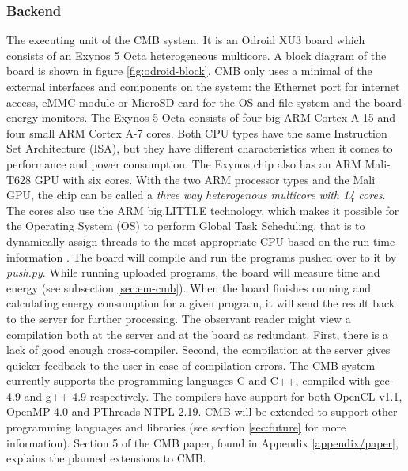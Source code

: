 \subsubsection{Backend} The executing unit of the CMB system. It is an Odroid XU3 board \cite{m:odroid} which consists of an Exynos 5 Octa heterogeneous multicore. A block diagram of the board is shown in figure \ref{fig:odroid-block}. CMB only uses a minimal of the external interfaces and components on the system: the Ethernet port for internet access, eMMC module or MicroSD card for the OS and file system and the board energy monitors. The Exynos 5 Octa consists of four big ARM Cortex A-15 and four small ARM Cortex A-7 cores. Both CPU types have the same Instruction Set Architecture (ISA), but they have different characteristics when it comes to performance and power consumption. The Exynos chip also has an ARM Mali-T628 GPU with six cores. With the two ARM processor types and the Mali GPU, the chip can be called a \textit{three way heterogenous multicore with 14 cores}. The cores also use the ARM big.LITTLE technology, which makes it possible for the Operating System (OS) to perform Global Task Scheduling, that is to dynamically assign threads to the most appropriate CPU based on the run-time information \cite{m:big-little}. The board will compile and run the programs pushed over to it by \textit{push.py}. While running uploaded programs, the board will measure time and energy (see subsection \ref{sec:em-cmb}). When the board finishes running and calculating energy consumption for a given program, it will send the result back to the server for further processing. The observant reader might view a compilation both at the server and at the board as redundant. First, there is a lack of good enough cross-compiler. Second, the compilation at the server gives quicker feedback to the user in case of compilation errors. The CMB system currently supports the programming languages C and C++, compiled with gcc-4.9 and g++-4.9 respectively. The compilers have support for both OpenCL v1.1, OpenMP 4.0 and PThreads NTPL 2.19. CMB will be extended to support other programming languages and libraries (see section \ref{sec:future} for more information). Section 5 of the CMB paper, found in Appendix \ref{appendix/paper}, explains the planned extensions to CMB.

